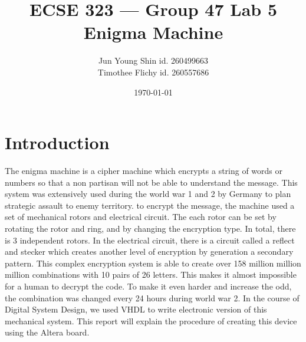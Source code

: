 \documentclass[10pt]{article}
\title{ECSE 323 --- Group 47 Lab 5 Enigma Machine}
\author{Jun Young Shin id. 260499663\\ Timothee Flichy id. 260557686}
\date{\today}
\begin{document}
\maketitle
\section{Introduction}
The enigma machine is a cipher machine which encrypts a string of words or numbers so that a non partisan will not be able to understand the message. This system was extensively used during the world war 1 and 2 by Germany to plan strategic assault to enemy territory. to encrypt the message, the machine used a set of mechanical rotors and electrical circuit. The each rotor can be set by rotating the rotor and ring, and by changing the encryption type. In total, there is 3 independent rotors. In the electrical circuit, there is a circuit called a reflect and stecker which creates another level of encryption by generation a secondary pattern. This complex encryption system is able to create over 158 million million million combinations with 10 pairs of 26 letters. This makes it almost impossible for a human to decrypt the code. To make it even harder and increase the odd, the combination was changed every 24 hours during world war 2. In the course of Digital System Design, we used VHDL to write electronic version of this mechanical system. This report will explain the procedure of creating this device using the Altera board.
\end{document}
